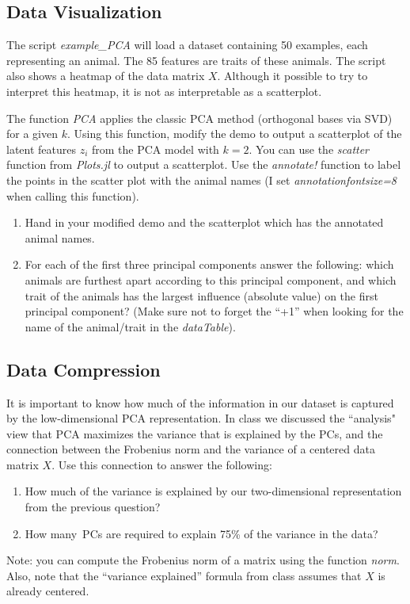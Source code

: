 \documentclass{article}
\def\blu#1{{\color{blu}#1}}
\def\enum#1{\begin{enumerate}#1\end{enumerate}}
\begin{document}
\subsection{Data Visualization}

The script \emph{example\_PCA} will load a dataset containing 50 examples, each representing an animal. The 85 features are traits of these animals. The script also shows a heatmap of the data matrix $X$. Although it possible to try to interpret this heatmap, it is not as interpretable as a scatterplot.

The function \emph{PCA} applies the classic PCA method (orthogonal bases via SVD) for a given $k$. Using this function, modify the demo to output a scatterplot of the latent features $z_i$ from the PCA model with $k=2$. You can use the \emph{scatter} function from \emph{Plots.jl} to output a scatterplot. Use the \emph{annotate!} function to label the points in the scatter plot with the animal names (I set \emph{annotationfontsize=8} when calling this function).
\blu{
\enum{
\item  Hand in your modified demo and the scatterplot which has the annotated animal names.
\pagebreak
\item For each of the first three principal components answer the following: which animals are furthest apart according to this principal component, and which trait of the animals has the largest influence (absolute value) on the first principal component? (Make sure not to forget the ``+1'' when looking for the name of the animal/trait in the \emph{dataTable}).
}
}

\pagebreak

\subsection{Data Compression}

It is important to know how much of the information in our dataset is captured by the low-dimensional PCA representation.
In class we discussed the ``analysis" view that PCA maximizes the variance that is explained by the PCs, and the connection between the Frobenius norm and the variance of a centered data matrix $X$. Use this connection to answer the following:
\blu{\enum{
\item How much of the variance is explained by our two-dimensional representation from the previous question?
\item How many\ PCs are required to explain 75\% of the variance in the data?
}}
Note: you can compute the Frobenius norm of a matrix using the function \emph{norm}. Also, note that the ``variance explained'' formula from class assumes that $X$ is already centered.
\end{document}
